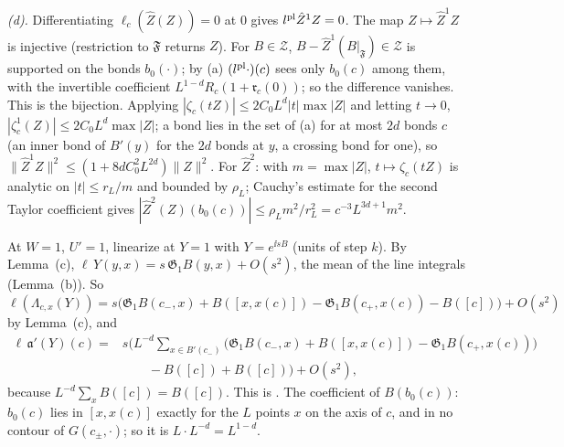 \begin{detail}
\begin{step}
\end{step}
\begin{step}
\emph{(d).} Differentiating $\ell_c(\hat Z(Z))=0$ at $0$ gives $l^{\rm pl}\hat Z^1Z=0$. The map $Z\mapsto\hat Z^1Z$ is injective (restriction to $\mathfrak F$ returns $Z$). For $B\in\mathcal Z$, $B-\hat Z^1(B|_{\mathfrak F})\in\mathcal Z$ is supported on the bonds $b_0(\cdot)$; by (a) $(l^{\rm pl}\cdot)(c)$ sees only $b_0(c)$ among them, with the invertible coefficient $L^{1-d}R_c(1+\mathfrak r_c(0))$; so the difference vanishes. This is the bijection. Applying $|\zeta_c(tZ)|\le2C_0L^d|t|\max|Z|$ and letting $t\to0$, $|\zeta^1_c(Z)|\le2C_0L^d\max|Z|$; a bond lies in the set of (a) for at most $2d$ bonds $c$ (an inner bond of $B'(y)$ for the $2d$ bonds at $y$, a crossing bond for one), so $\|\hat Z^1Z\|^2\le(1+8dC_0^2L^{2d})\|Z\|^2$. For $\hat Z^2$: with $m=\max|Z|$, $t\mapsto\zeta_c(tZ)$ is analytic on $|t|\le r_L/m$ and bounded by $\rho_L$; Cauchy's estimate for the second Taylor coefficient gives $|\hat Z^2(Z)(b_0(c))|\le\rho_Lm^2/r_L^2=c^{-3}L^{3d+1}m^2$.
\end{step}
\end{detail}

\begin{detail}\label{d7:qplain}
At $W=1$, $U'=1$, linearize  at $Y=1$ with $Y=e^{\ii sB}$ (units of step $k$). By Lemma~(c), $\ell\,Y(y,x)=s\,\mathfrak G_1B(y,x)+O(s^2)$, the mean of the line integrals (Lemma~(b)). So $\ell(\Lambda_{c,x}(Y))=s\big(\mathfrak G_1B(c_-,x)+B([x,x(c)])-\mathfrak G_1B(c_+,x(c))-B([c])\big)+O(s^2)$ by Lemma~(c), and
\[
\begin{aligned}
\ell\,\mathfrak a'(Y)(c)={}&s\Big(L^{-d}\sum_{x\in B'(c_-)}\big(\mathfrak G_1B(c_-,x)+B([x,x(c)])-\mathfrak G_1B(c_+,x(c))\big)\\
&\qquad-B([c])+B([c])\Big)+O(s^2),
\end{aligned}
\]
because $L^{-d}\sum_xB([c])=B([c])$. This is . The coefficient of $B(b_0(c))$: $b_0(c)$ lies in $[x,x(c)]$ exactly for the $L$ points $x$ on the axis of $c$, and in no contour of $G(c_\pm,\cdot)$; so it is $L\cdot L^{-d}=L^{1-d}$.
\end{detail}

